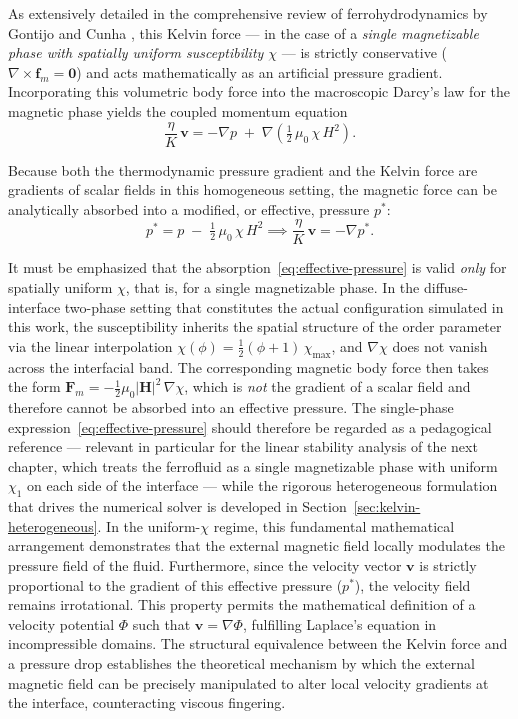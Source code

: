 As extensively detailed in the comprehensive review of ferrohydrodynamics by Gontijo and Cunha \cite{gontijo_cunha_review}, this Kelvin force --- in the case of a \emph{single magnetizable phase with spatially uniform susceptibility $\chi$} --- is strictly conservative ($\nabla \times \mathbf{f}_m = \mathbf{0}$) and acts mathematically as an artificial pressure gradient.
Incorporating this volumetric body force into the macroscopic Darcy's law for the magnetic phase yields the coupled momentum equation
\begin{equation}
    \frac{\eta}{K}\, \mathbf{v} = -\nabla p \;+\; \nabla \!\left( \tfrac{1}{2}\, \mu_0\, \chi\, H^2 \right).
\end{equation}

Because both the thermodynamic pressure gradient and the Kelvin force are gradients of scalar fields in this homogeneous setting, the magnetic force can be analytically absorbed into a modified, or effective, pressure $p^*$:
\begin{equation}
\label{eq:effective-pressure}
    p^* = p \;-\; \tfrac{1}{2}\, \mu_0\, \chi\, H^2 \implies \frac{\eta}{K}\, \mathbf{v} = -\nabla p^*.
\end{equation}

It must be emphasized that the absorption~\eqref{eq:effective-pressure} is valid \emph{only} for spatially uniform $\chi$, that is, for a single magnetizable phase.
In the diffuse-interface two-phase setting that constitutes the actual configuration simulated in this work, the susceptibility inherits the spatial structure of the order parameter via the linear interpolation $\chi(\phi) = \tfrac{1}{2}(\phi+1)\,\chi_{\max}$, and $\nabla\chi$ does not vanish across the interfacial band.
The corresponding magnetic body force then takes the form $\mathbf{F}_m = -\tfrac{1}{2}\mu_0|\mathbf{H}|^2\,\nabla\chi$, which is \emph{not} the gradient of a scalar field and therefore cannot be absorbed into an effective pressure.
The single-phase expression~\eqref{eq:effective-pressure} should therefore be regarded as a pedagogical reference --- relevant in particular for the linear stability analysis of the next chapter, which treats the ferrofluid as a single magnetizable phase with uniform $\chi_1$ on each side of the interface --- while the rigorous heterogeneous formulation that drives the numerical solver is developed in Section~\ref{sec:kelvin-heterogeneous}.
In the uniform-$\chi$ regime, this fundamental mathematical arrangement demonstrates that the external magnetic field locally modulates the pressure field of the fluid.
Furthermore, since the velocity vector $\mathbf{v}$ is strictly proportional to the gradient of this effective pressure ($p^*$), the velocity field remains irrotational.
This property permits the mathematical definition of a velocity potential $\Phi$ such that $\mathbf{v} = \nabla \Phi$, fulfilling Laplace's equation in incompressible domains.
The structural equivalence between the Kelvin force and a pressure drop establishes the theoretical mechanism by which the external magnetic field can be precisely manipulated to alter local velocity gradients at the interface, counteracting viscous fingering.

